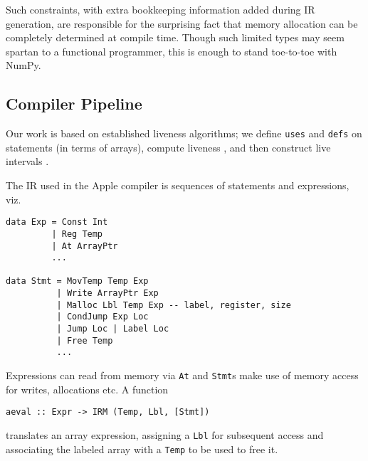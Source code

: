 \documentclass[acmsmall,screen,anonymous,nonacm]{acmart}
\begin{document}

Such constraints, with extra bookkeeping information added during IR generation, are responsible for the surprising fact that memory allocation can be completely determined at compile time.
Though such limited types may seem spartan to a functional programmer, this is enough to stand toe-to-toe with NumPy. %

\subsection{Compiler Pipeline}

Our work is based on established liveness algorithms; we define {\tt uses} and {\tt defs} on statements (in terms of arrays), compute liveness \cite[pp.~213-216]{appel1998}, and then construct live intervals \cite{poletto1999}.



The IR used in the Apple compiler is sequences of statements and expressions, viz.

\begin{verbatim}
data Exp = Const Int
         | Reg Temp
         | At ArrayPtr
         ...

data Stmt = MovTemp Temp Exp
          | Write ArrayPtr Exp
          | Malloc Lbl Temp Exp -- label, register, size
          | CondJump Exp Loc
          | Jump Loc | Label Loc
          | Free Temp
          ...
\end{verbatim}

Expressions can read from memory via {\tt At} and {\tt Stmt}s make use of memory access for writes, allocations etc. A function

\begin{verbatim}
aeval :: Expr -> IRM (Temp, Lbl, [Stmt])
\end{verbatim}
translates an array expression, assigning a {\tt Lbl} for subsequent access and associating the labeled array with a {\tt Temp} to be used to free it.
\end{document}
